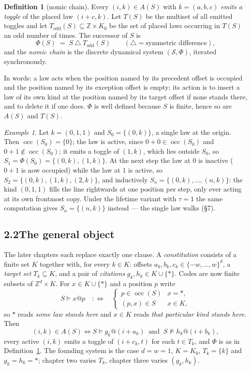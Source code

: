 \documentclass[10pt]{article}
\theoremstyle{definition}
\newtheorem{definition}[theorem]{Definition}
\theoremstyle{remark}
\newtheorem{example}[theorem]{Example}
\begin{document}
\begin{definition}[nomic chain]\label{def:chain}
Every $(i,k)\in A(S)$ with $k=(a,b,c)$ \emph{emits a toggle} of the placed law
$(i+c,k)$. Let $T(S)$ be the multiset of all emitted toggles and let
$T_{\mathrm{odd}}(S)\subseteq\mathbb{Z}\times K_0$ be the set of placed laws
occurring in $T(S)$ an odd number of times. The successor of $S$ is
\[
  \Phi(S)\;=\;S\ \triangle\ T_{\mathrm{odd}}(S)
  \qquad(\triangle=\text{symmetric difference}),
\]
and the \emph{nomic chain} is the discrete dynamical system
$(\mathcal{S},\Phi)$, iterated synchronously.
\end{definition}

\noindent In words: a law acts when the position named by its precedent offset
is occupied and the position named by its exception offset is empty; its action
is to insert a law of its own kind at the position named by its target offset if
none stands there, and to delete it if one does. $\Phi$ is well defined because
$S$ is finite, hence so are $A(S)$ and $T(S)$.

\begin{example}
Let $k=(0,1,1)$ and $S_0=\{(0,k)\}$, a single law at the origin. Then
$\operatorname{occ}(S_0)=\{0\}$; the law is active, since $0+0\in
\operatorname{occ}(S_0)$ and $0+1\notin\operatorname{occ}(S_0)$; it emits a
toggle of $(1,k)$, which lies outside $S_0$, so
$S_1=\Phi(S_0)=\{(0,k),(1,k)\}$. At the next step the law at $0$ is inactive
($0+1$ is now occupied) while the law at $1$ is active, so
$S_2=\{(0,k),(1,k),(2,k)\}$, and inductively $S_n=\{(0,k),\dots,(n,k)\}$: the
kind $(0,1,1)$ fills the line rightwards at one position per step, only ever
acting at its own frontmost copy. Under the lifetime variant with $\tau=1$ the
same computation gives $S_n=\{(n,k)\}$ instead --- the single law walks
(\S7).
\end{example}

\subsection*{2.2\quad The general object}
The later chapters each replace exactly one clause. A \emph{constitution}
consists of a finite set $K$ together with, for every $k\in K$: offsets
$a_k,b_k,c_k\in\{-w,\dots,w\}^d$, a \emph{target set} $T_k\subseteq K$, and a
pair of \emph{citations} $g_k,h_k\in K\cup\{\ast\}$. Codes are now finite
subsets of $\mathbb{Z}^d\times K$. For $x\in K\cup\{\ast\}$ and a position $p$
write
\[
  S\models x@p
  \quad:\iff\quad
  \begin{cases} p\in\operatorname{occ}(S) & x=\ast,\\[2pt]
                (p,x)\in S & x\in K,\end{cases}
\]
so $\ast$ reads \emph{some law stands here} and $x\in K$ reads \emph{that
particular kind stands here}. Then
\[
  (i,k)\in A(S)\iff S\models g_k@(i+a_k)\ \text{ and }\ S\not\models h_k@(i+b_k),
\]
every active $(i,k)$ emits a toggle of $(i+c_k,t)$ for each $t\in T_k$, and
$\Phi$ is as in Definition~\ref{def:chain}. The founding system is the case $d=w=1$, $K=K_0$,
$T_k=\{k\}$ and $g_k=h_k=\ast$; chapter two varies $T_k$, chapter three varies
$(g_k,h_k)$.
\end{document}
